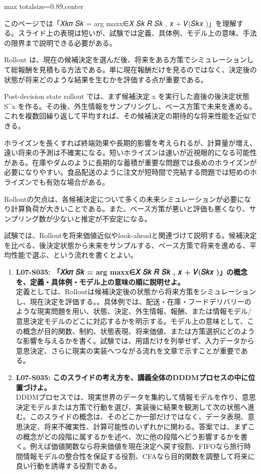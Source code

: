 \begin{minipage}[t]{0.58\textwidth}
\begin{adjustbox}{max totalsize={\textwidth}{0.89\textheight},center}
\begin{minipage}{\textwidth}\scriptsize
{}このページでは「𝑋𝑘𝜋 𝑆𝑘 = arg maxx∈𝑋 𝑆𝑘 𝑅 𝑆𝑘 , 𝑥 + 𝑉(𝑆𝑘𝑥 )」を理解する。スライド上の表現は短いが、試験では定義、具体例、モデル上の意味、手法の限界まで説明できる必要がある。\par
Rollout は、現在の候補決定を選んだ後、将来をある方策でシミュレーションして総報酬を見積もる方法である。単に現在報酬だけを見るのではなく、決定後の状態が将来どのような結果を生むかを評価する点が重要である。\par
Post-decision state rollout では、まず候補決定 x を実行した直後の後決定状態 S\textasciicircum{}x を作る。その後、外生情報をサンプリングし、ベース方策で未来を進める。これを複数回繰り返して平均すれば、その候補決定の期待的な将来性能を近似できる。\par
ホライズンを長くすれば終端効果や長期的影響を考えられるが、計算量が増え、遠い将来の予測は不確実になる。短いホライズンは速いが近視眼的になる可能性がある。在庫やダムのように長期的な蓄積が重要な問題では長めのホライズンが必要になりやすい。食品配送のように注文が短時間で完結する問題では短めのホライズンでも有効な場合がある。\par
Rolloutの欠点は、各候補決定について多くの未来シミュレーションが必要になり計算負荷が大きいことである。また、ベース方策が悪いと評価も悪くなり、サンプリング数が少ないと推定が不安定になる。\par
試験では、Rolloutを将来価値近似やlook-aheadと関連づけて説明する。候補決定を比べる、後決定状態から未来をサンプルする、ベース方策で将来を進める、平均性能で選ぶ、という流れを書くとよい。\par{}\begin{enumerate}\item \textbf{L07-S035: 「𝑋𝑘𝜋 𝑆𝑘 = arg maxx∈𝑋 𝑆𝑘 𝑅 𝑆𝑘 , 𝑥 + 𝑉(𝑆𝑘𝑥 )」の概念を、定義・具体例・モデル上の意味の順に説明せよ。}\\定義としては、Rolloutは候補決定後の状態から将来方策をシミュレーションし、現在決定を評価する。。具体例では、配送・在庫・フードデリバリーのような現実問題を用い、状態、決定、外生情報、報酬、または情報モデル/意思決定モデルのどこに対応するかを明示する。モデル上の意味として、この概念が目的関数、制約、状態表現、将来価値、または方策選択にどのような影響を与えるかを書く。試験では、用語だけを列挙せず、入力データから意思決定、さらに現実の実装へつながる流れを文章で示すことが重要である。\item \textbf{L07-S035: このスライドの考え方を、講義全体のDDDMプロセスの中に位置づけよ。}\\DDDMプロセスでは、現実世界のデータを集約して情報モデルを作り、意思決定モデルまたは方策で行動を選び、実装後に結果を観測して次の状態へ進む。このスライドの概念は、そのどこか一部だけではなく、データ表現、意思決定、将来不確実性、計算可能性のいずれかに関わる。答案では、まずこの概念がどの段階に属するかを述べ、次に他の段階へどう影響するかを書く。例えば価値関数なら将来価値を現在決定へ戻す役割、FIFOなら旅行時間情報モデルの整合性を保証する役割、CFAなら目的関数を調整して将来に良い行動を誘導する役割である。\end{enumerate}

\end{minipage}
\end{adjustbox}
\end{minipage}
